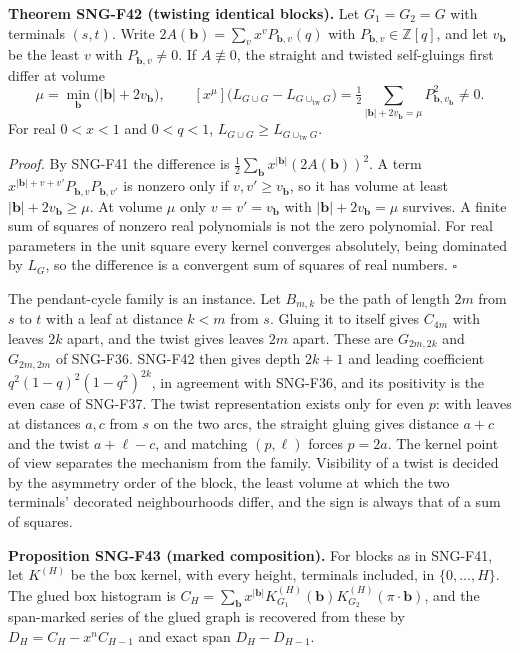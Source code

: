 \documentclass[
  11pt,
  a4paper,
]{report}
\begin{document}
\textbf{Theorem SNG-F42 (twisting identical blocks).} Let \(G_1=G_2=G\)
with terminals \((s,t)\). Write
\(2A(\mathbf b)=\sum_vx^vP_{\mathbf b,v}(q)\) with
\(P_{\mathbf b,v}\in\mathbb Z[q]\), and let \(v_{\mathbf b}\) be the
least \(v\) with \(P_{\mathbf b,v}\ne0\). If \(A\not\equiv0\), the
straight and twisted self-gluings first differ at volume \[
\mu=\min_{\mathbf b}\bigl(|\mathbf b|+2v_{\mathbf b}\bigr),\qquad
[x^\mu]\bigl(L_{G\cup G}-L_{G\cup_{\mathrm{tw}}G}\bigr)=\tfrac12\sum_{|\mathbf b|+2v_{\mathbf b}=\mu}P_{\mathbf b,v_{\mathbf b}}^2\ne0 .
\] For real \(0<x<1\) and \(0<q<1\),
\(L_{G\cup G}\ge L_{G\cup_{\mathrm{tw}}G}\).

\emph{Proof.} By SNG-F41 the difference is
\(\frac12\sum_{\mathbf b}x^{|\mathbf b|}(2A(\mathbf b))^2\). A term
\(x^{|\mathbf b|+v+v'}P_{\mathbf b,v}P_{\mathbf b,v'}\) is nonzero only
if \(v,v'\ge v_{\mathbf b}\), so it has volume at least
\(|\mathbf b|+2v_{\mathbf b}\ge\mu\). At volume \(\mu\) only
\(v=v'=v_{\mathbf b}\) with \(|\mathbf b|+2v_{\mathbf b}=\mu\) survives.
A finite sum of squares of nonzero real polynomials is not the zero
polynomial. For real parameters in the unit square every kernel
converges absolutely, being dominated by \(L_G\), so the difference is a
convergent sum of squares of real numbers. \(\square\)

The pendant-cycle family is an instance. Let \(B_{m,k}\) be the path of
length \(2m\) from \(s\) to \(t\) with a leaf at distance \(k<m\) from
\(s\). Gluing it to itself gives \(C_{4m}\) with leaves \(2k\) apart,
and the twist gives leaves \(2m\) apart. These are \(G_{2m,2k}\) and
\(G_{2m,2m}\) of SNG-F36. SNG-F42 then gives depth \(2k+1\) and leading
coefficient \(q^2(1-q)^2(1-q^2)^{2k}\), in agreement with SNG-F36, and
its positivity is the even case of SNG-F37. The twist representation
exists only for even \(p\): with leaves at distances \(a,c\) from \(s\)
on the two arcs, the straight gluing gives distance \(a+c\) and the
twist \(a+\ell-c\), and matching \((p,\ell)\) forces \(p=2a\). The
kernel point of view separates the mechanism from the family. Visibility
of a twist is decided by the asymmetry order of the block, the least
volume at which the two terminals' decorated neighbourhoods differ, and
the sign is always that of a sum of squares.

\textbf{Proposition SNG-F43 (marked composition).} For blocks as in
SNG-F41, let \(K^{(H)}\) be the box kernel, with every height, terminals
included, in \(\{0,\ldots,H\}\). The glued box histogram is
\(C_H=\sum_{\mathbf b}x^{|\mathbf b|}K^{(H)}_{G_1}(\mathbf b)K^{(H)}_{G_2}(\pi\cdot\mathbf b)\),
and the span-marked series of the glued graph is recovered from these by
\(D_H=C_H-x^nC_{H-1}\) and exact span \(D_H-D_{H-1}\).
\end{document}

